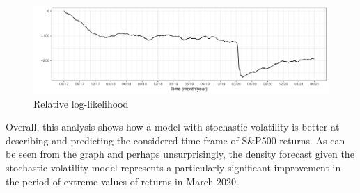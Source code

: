 \documentclass[
]{book}
\theoremstyle{break}
\theoremstyle{nonumberplain}
\begin{document}
\begin{figure}[H]

{\centering \includegraphics{final-draft_files/figure-latex/cll_plot-1} 

}

\caption{Relative log-likelihood}\label{fig:cll_plot}
\end{figure}

Overall, this analysis shows how a model with stochastic volatility is
better at describing and predicting the considered time-frame of S\&P500
returns. As can be seen from the graph and perhaps unsurprisingly, the
density forecast given the stochastic volatility model represents a
particularly significant improvement in the period of extreme values of
returns in March 2020.

\backmatter
\end{document}
